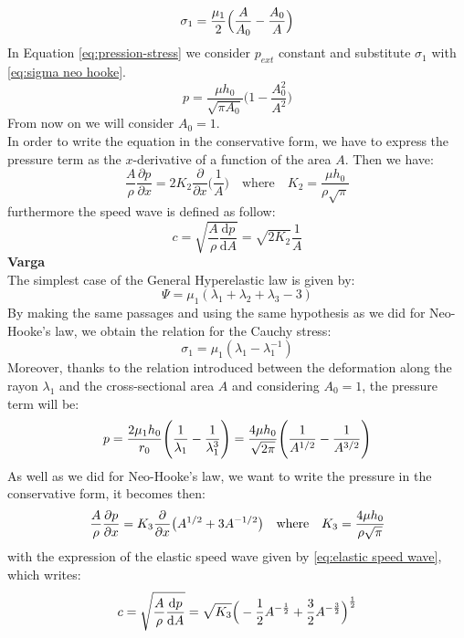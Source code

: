 \documentclass[12pt,a4paper]{article}
\numberwithin{equation}{section}
\begin{document}
 \begin{equation}\label{eq:sigma neo hooke}
 \sigma_1 = {\mu_1 \over 2} \Big(\frac{A}{A_0} - \frac{A_0}{A}\Big)
 \end{equation}
 In Equation \ref{eq:pression-stress} we consider $p_{ext}$ constant and substitute $\sigma_1$ with \ref{eq:sigma neo hooke}.
\begin{equation} \label{eq:pressure NH}
p = \frac{\mu h_0}{\sqrt{\pi A_0}}\Bigg(1-\frac{A_0^2}{A^2}\Bigg)
\end{equation}
From now on we will consider $A_0 = 1$. \\
In order to write the equation in the conservative form, we have to express the pressure term as the $x$-derivative of a function of the area $A$. Then we have:
\begin{equation} \label{eq:Neo Hooke pressure law}
\frac{A}{\rho}\frac{\partial p}{\partial x} = 2K_2 \frac{\partial}{\partial x} \Bigg(\frac{1}{A}\Bigg) \quad \textrm{where} \quad K_2 = \frac{\mu h_0}{\rho \sqrt{\pi}}
\end{equation}
furthermore the speed wave is defined as follow:
\begin{equation}\label{eq:speed_NH}
c = \sqrt{\frac{A}{\rho} \frac{\textrm{d}p}{\textrm{d} A}} = \sqrt{2 K_2}\frac{1}{A}
\end{equation}
{\bf Varga}\\
The simplest case of the General Hyperelastic law is given by:
\begin{equation}
\Psi = \mu_1(\lambda_1 + \lambda_2 + \lambda_3 - 3 )
\end{equation}
By making the same passages and using the same hypothesis as we did for Neo-Hooke's law, we obtain the relation for the Cauchy stress:
\begin{equation}
\sigma_1 = \mu_1 (\lambda_1 -\lambda_1^{-1})
\end{equation}
Moreover, thanks to the relation introduced between the deformation along the rayon $\lambda_1$ and the cross-sectional area $A$ and considering $A_0 = 1$, the pressure term will be:
\begin{equation}
p = \frac{2\mu_1 h_0}{r_0} \Bigg({1 \over \lambda_1}-{1 \over \lambda_1^3}\Bigg)  = {4\mu h_0 \over \sqrt{2\pi}} \Bigg(\frac{1}{A^{1/2}}-\frac{1}{A^{3/2}}\Bigg) 
\end{equation}
As well as we did for Neo-Hooke's law, we want to write the pressure in the conservative form, it becomes then:
\begin{equation} \label{eq:Varga pressure law}
\frac{A}{\rho}\frac{\partial p}{\partial x} = K_3 \frac{\partial}{\partial x} \big(A^{1/2}+3 A^{-1/2}\big) \quad \textrm{where} \quad K_3 = {4\mu h_0 \over \rho\sqrt{\pi}}
\end{equation}
with the expression of the elastic speed wave given by \ref{eq:elastic speed wave}, which writes:
\begin{equation} \label{eq:speed_V}
c = \sqrt{\frac{A}{\rho} \frac{\textrm{d}p}{\textrm{d} A}} = \sqrt{K_3}\Big(-\frac{1}{2} A^{-{1\over 2}}+\frac{3}{2}A^{-{3\over 2}}\Big)^{1\over 2}
\end{equation}
\end{document}
